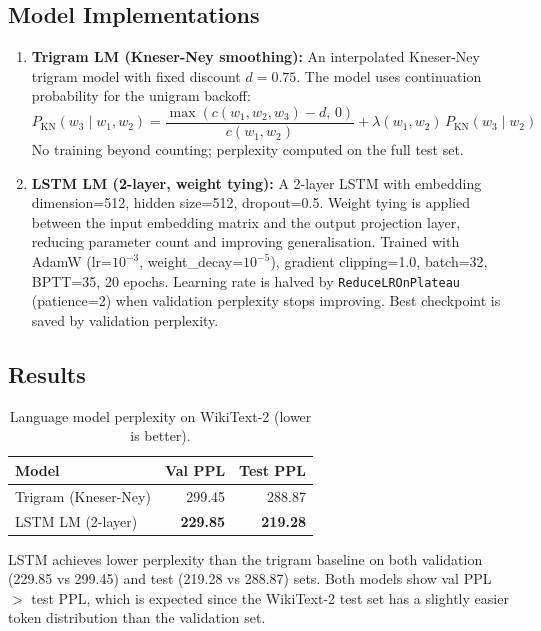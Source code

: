 \documentclass[11pt,a4paper]{article}
\begin{document}
\subsection{Model Implementations}

\begin{enumerate}
    \item \textbf{Trigram LM (Kneser-Ney smoothing):} An interpolated Kneser-Ney trigram model with fixed discount $d=0.75$. The model uses continuation probability for the unigram backoff:
    \[
      P_{\mathrm{KN}}(w_3 \mid w_1, w_2) = \frac{\max(c(w_1,w_2,w_3)-d,\,0)}{c(w_1,w_2)} + \lambda(w_1,w_2)\,P_{\mathrm{KN}}(w_3 \mid w_2)
    \]
    No training beyond counting; perplexity computed on the full test set.

    \item \textbf{LSTM LM (2-layer, weight tying):} A 2-layer LSTM with embedding dimension=512, hidden size=512, dropout=0.5. Weight tying is applied between the input embedding matrix and the output projection layer, reducing parameter count and improving generalisation. Trained with AdamW (lr=$10^{-3}$, weight\_decay=$10^{-5}$), gradient clipping=1.0, batch=32, BPTT=35, 20 epochs. Learning rate is halved by \texttt{ReduceLROnPlateau} (patience=2) when validation perplexity stops improving. Best checkpoint is saved by validation perplexity.
\end{enumerate}

\subsection{Results}

\begin{table}[H]
\centering
\caption{Language model perplexity on WikiText-2 (lower is better).}
\label{tab:q5results}
\begin{tabular}{lrr}
\toprule
Model & Val PPL & Test PPL \\
\midrule
Trigram (Kneser-Ney) & 299.45 & 288.87 \\
LSTM LM (2-layer)    & \textbf{229.85} & \textbf{219.28} \\
\bottomrule
\end{tabular}
\end{table}

LSTM achieves lower perplexity than the trigram baseline on both validation (229.85 vs 299.45) and test (219.28 vs 288.87) sets. Both models show val PPL $>$ test PPL, which is expected since the WikiText-2 test set has a slightly easier token distribution than the validation set.
\end{document}
